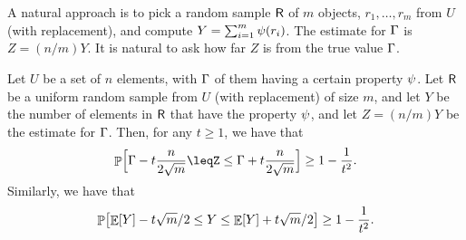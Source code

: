 A natural approach is to pick a random sample $\mathsf{R}$ of $m$ objects,
$r_1, \ldots, r_m$ from $U$ (with replacement), and compute
$Y = \sum_{i=1}^m \propertyX{r_i}$.  The estimate for $\Gamma$ is
$Z = (n/m) Y$. It is natural to ask how far $Z$ is from the true value
$\Gamma$.


\begin{lemma}
    Let $U$ be a set of $n$ elements, with $\Gamma$ of them having a
    certain property $\psi$. Let $\mathsf{R}$ be a uniform random
    sample from $U$ (with replacement) of size $m$, and let $Y$ be the
    number of elements in $\mathsf{R}$ that have the property $\psi$,
    and let $Z = (n/m)Y$ be the estimate for $\Gamma$.  Then, for any
    $t\geq 1$, we have that
    \begin{equation*}
        \Prob{ \Bigl. \smash{\numC - t \frac{n}{2\sqrt{m}}%
              \leq%
              Z%
              \leq%
              \numC + t \frac{n}{2\sqrt{m}} } }%
        \geq%
        1- \frac{1}{t^2}.
    \end{equation*}
    Similarly, we have that
    \begin{equation*}
        \Prob{ \Ex{Y} - t \sqrt{m}/2 \leq Y \leq \Ex{Y} + t \sqrt{m}/2
        } \geq 1- \frac{1}{t^2}.
    \end{equation*}
\end{lemma}

